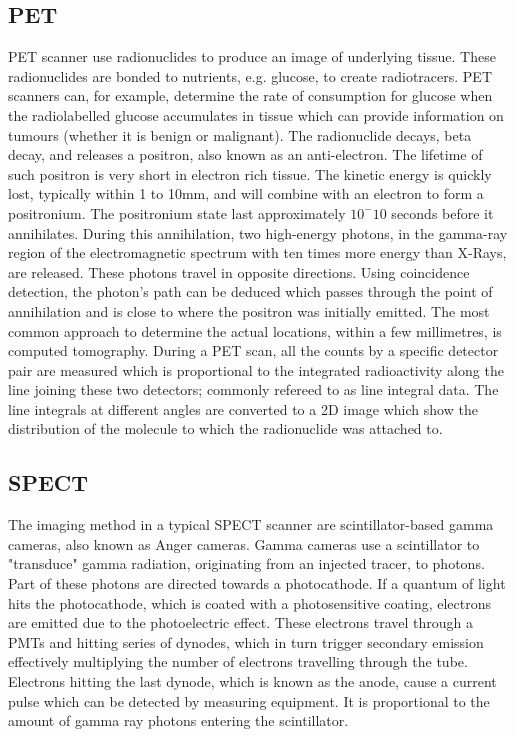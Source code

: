 \subsection{PET}
\ac{PET} scanner use radionuclides to produce an image of underlying tissue. These radionuclides are bonded to nutrients, e.g. glucose, to create radiotracers. \ac{PET} scanners can, for example, determine the rate of consumption for glucose when the radiolabelled glucose accumulates in tissue \citep{PETscan2003} which can provide information on tumours (whether it is benign or malignant). The radionuclide decays, beta decay, and releases a positron, also known as an anti-electron. The lifetime of such positron is very short in electron rich tissue. The kinetic energy is quickly lost, typically within 1 to 10mm, and will combine with an electron to form a positronium. The positronium state last approximately $10^-10$ seconds before it annihilates. During this annihilation, two high-energy photons\citep{PETscan1999}, in the gamma-ray region of the electromagnetic spectrum with ten times more energy than X-Rays, are released. These photons travel in opposite directions. Using coincidence detection, the photon's path can be deduced which passes through the point of annihilation and is close to where the positron was initially emitted. The most common approach to determine the actual locations, within a few millimetres, is computed tomography. During a \ac{PET} scan, all the counts by a specific detector pair are measured which is proportional to the integrated radioactivity along the line joining these two detectors; commonly refereed to as line integral data. The line integrals at different angles are converted to a 2D image which show the distribution of the molecule to which the radionuclide was attached to\citep{cherry2006pet}.

\subsection{SPECT}
The imaging method in a typical \ac{SPECT} scanner are scintillator-based gamma cameras, also known as Anger cameras. Gamma cameras use a scintillator to "transduce" gamma radiation, originating from an injected tracer, to photons. Part of these photons are directed towards a photocathode. If a quantum of light hits the photocathode, which is coated with a photosensitive coating, electrons are emitted due to the photoelectric effect. These electrons travel through a \acp{PMT} and hitting series of dynodes, which in turn trigger secondary emission effectively multiplying the number of electrons travelling through the tube. Electrons hitting the last dynode, which is known as the anode, cause a current pulse which can be detected by measuring equipment. It is proportional to the amount of gamma ray photons entering the scintillator\citep{CZTTech2009}.

